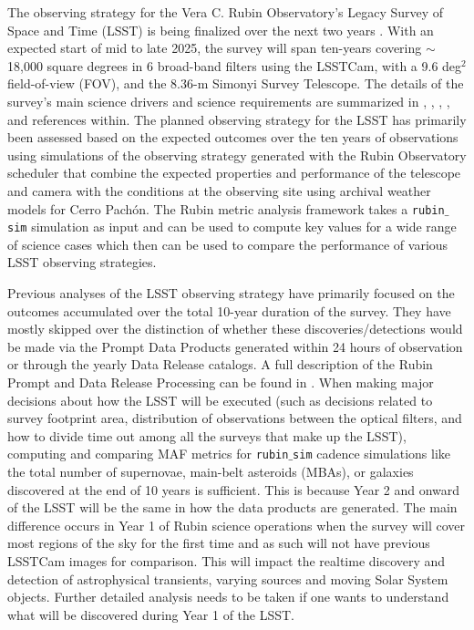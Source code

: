 \documentclass[preprint,linenumbers]{aastex631}
\begin{document}
	The observing strategy for the Vera C. Rubin Observatory's Legacy Survey of Space and Time (LSST) is being finalized over the next two years \citep{SCOC_Report_1,SCOC_Report_2}. With an expected start of mid to late 2025, the survey will span ten-years covering $\sim$18,000 square degrees in 6 broad-band filters using the LSSTCam, with a 9.6 deg$^2$ field-of-view (FOV), and the 8.36-m Simonyi Survey Telescope. The details of the survey's  main science drivers and science requirements are summarized in \cite{lsstsciencecollaborationLSSTScienceBook2009}, \cite{lsstSRD}, \cite{2019ApJ...873..111I}, \cite{2022ApJS..258....1B}, and references within. The planned observing strategy for the LSST has primarily been assessed based on the expected outcomes over the ten years of observations using simulations of the observing strategy generated with the Rubin Observatory scheduler \citep[\texttt{rubin$\_$sim};][]{2014SPIE.9150E..14C, 2014SPIE.9150E..15D, 2017arXiv170804058L, 2019AJ....157..151N, jones_r_lynne_2020_4048838} that combine the expected properties and performance of the telescope and camera with the conditions at the observing site using archival weather models for Cerro Pach\'on. The Rubin metric analysis framework \citep[MAF; ][]{2014SPIE.9149E..0BJ}  takes a  \texttt{rubin$\_$sim}  simulation as input and can be used to compute key values for a wide range of science cases which then can be used to compare the performance of various LSST  observing strategies.
	
	Previous analyses of the LSST observing strategy  \cite[e.g., ][]{lsstsciencecollaborationScienceDrivenOptimizationLSST2017, 2018Icar..303..181J,  2018arXiv181200515L, 2022ApJS..258....5A, 2022ApJS..263...23G, schwambTuningLegacySurvey2023,2023ApJS..268...11F} have primarily focused on the outcomes accumulated over the total 10-year duration of the survey. They have mostly skipped over the distinction of whether these discoveries/detections would be made via  the Prompt Data Products generated within 24 hours of observation or through the yearly Data Release catalogs. A full description of the Rubin Prompt and Data Release Processing can be found in  \cite{LSE-163}.  When making major decisions about how the LSST will be executed (such as decisions related to survey footprint area, distribution of observations between the optical filters, and how to divide time out among all the surveys that make up the LSST), computing and comparing MAF metrics for \texttt{rubin$\_$sim} cadence simulations like the total number of supernovae, main-belt asteroids (MBAs), or galaxies discovered at the end of 10 years  is sufficient. This is because Year 2 and onward of the LSST will be the same in how the data products are generated. The main difference occurs in Year 1 of Rubin science operations when the survey will cover most regions of the sky for the first time and as such will not have previous LSSTCam images for comparison. This will impact the realtime discovery and detection of astrophysical transients, varying sources and moving Solar System objects. Further detailed analysis needs to be taken if one wants to understand what will be discovered during Year 1 of the LSST. 
	
\end{document}
